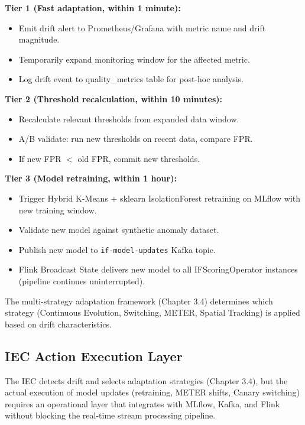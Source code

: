 \textbf{Tier 1 (Fast adaptation, within 1 minute):}
\begin{itemize}
    \item Emit drift alert to Prometheus/Grafana with metric name and drift magnitude.
    \item Temporarily expand monitoring window for the affected metric.
    \item Log drift event to quality\_metrics table for post-hoc analysis.
\end{itemize}

\textbf{Tier 2 (Threshold recalculation, within 10 minutes):}
\begin{itemize}
    \item Recalculate relevant thresholds from expanded data window.
    \item A/B validate: run new thresholds on recent data, compare FPR.
    \item If new FPR $<$ old FPR, commit new thresholds.
\end{itemize}

\textbf{Tier 3 (Model retraining, within 1 hour):}
\begin{itemize}
    \item Trigger Hybrid K-Means + sklearn IsolationForest retraining on MLflow with new training window.
    \item Validate new model against synthetic anomaly dataset.
    \item Publish new model to \texttt{if-model-updates} Kafka topic.
    \item Flink Broadcast State delivers new model to all IFScoringOperator instances (pipeline continues uninterrupted).
\end{itemize}

The multi-strategy adaptation framework (Chapter 3.4) determines which strategy (Continuous Evolution, Switching, METER, Spatial Tracking) is applied based on drift characteristics.

\subsection{IEC Action Execution Layer}

The IEC detects drift and selects adaptation strategies (Chapter 3.4), but the actual execution of model updates (retraining, METER shifts, Canary switching) requires an operational layer that integrates with MLflow, Kafka, and Flink without blocking the real-time stream processing pipeline.

